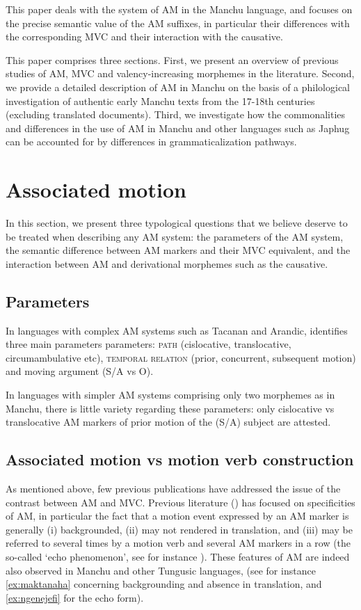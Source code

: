 \documentclass{article}
\begin{document}
This paper deals with the system of AM in the Manchu language, and focuses on the precise semantic value of the AM suffixes, in particular their differences with the corresponding MVC and their interaction with the causative. 

This paper comprises three sections. First, we present an overview of previous studies of AM, MVC and valency-increasing morphemes in the literature. Second, we provide a detailed description of AM in Manchu on the basis of a philological investigation of authentic early Manchu texts from the 17-18th centuries (excluding translated documents). Third, we investigate how the commonalities and differences in the use of AM in Manchu and other languages such as Japhug can be accounted for by differences in grammaticalization pathways.

\section{Associated motion}
In this section, we present three typological questions that we believe deserve to be treated when describing any AM system: the parameters of the AM system, the semantic difference between AM markers and their MVC equivalent, and the interaction between AM and derivational morphemes such as the causative.

\subsection{Parameters}
In languages with complex AM systems such as Tacanan and Arandic, \citet[8]{guillaume16am} identifies three main parameters parameters: \textsc{path} (cislocative, translocative, circumambulative etc),  \textsc{temporal relation} (prior, concurrent, subsequent motion) and moving argument (S/A vs O). 

In languages with simpler AM systems comprising only two morphemes as in Manchu, there is little variety regarding these parameters: only cislocative vs translocative AM markers of prior motion of the (S/A) subject are attested.

\subsection{Associated motion vs motion verb construction} \label{sec:japhug.am.mvc}
As mentioned above, few previous publications have addressed the issue of the contrast between AM and MVC. Previous literature (\citealt{wilkins91associated.motion, guillaume16am}) has focused on specificities of AM, in particular the fact that a motion event expressed by an AM marker is generally (i) backgrounded, (ii) may not rendered in translation, and (iii) may be referred to several times by a motion verb and several AM markers in a row (the so-called `echo phenomenon', see for instance \citet[11]{guillaume16am}). These features of AM are indeed also observed in Manchu and other Tungusic languages,  (see for instance \ref{ex:maktanaha} concerning backgrounding and absence in translation, and \ref{ex:ngenejefi} for the echo form).
\end{document}
